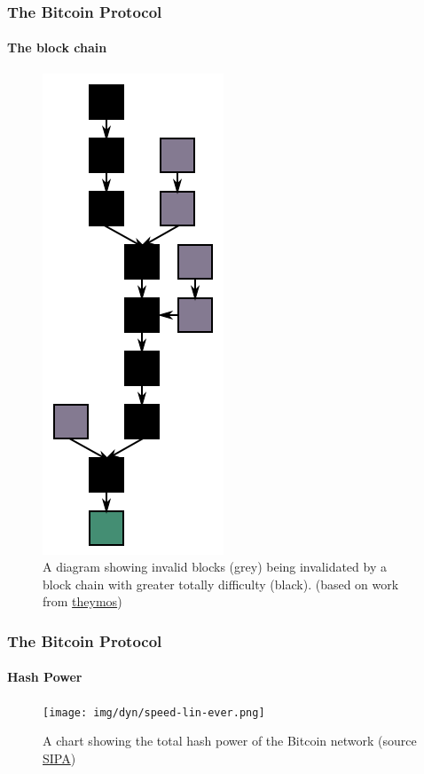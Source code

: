\documentclass{beamer}
\begin{document}
\begin{frame}
\frametitle{The Bitcoin Protocol}
\framesubtitle{The block chain}
\begin{figure}[h!]
    \centering
    \includegraphics[angle=-90,totalwidth=0.8\columnwidth]{img/Blockchain}
    \caption{A diagram showing invalid blocks (grey) being invalidated by a block chain with greater totally difficulty (black). (based on work from \href{http://theymos.com/}{theymos})}
    \label{fig:blockchain}
\end{figure}
\end{frame}

\begin{frame}
\frametitle{The Bitcoin Protocol}
\framesubtitle{Hash Power}
\begin{figure}[h!]
    \centering
    \texttt{[image: img/dyn/speed-lin-ever.png]}
    \caption{A chart showing the total hash power of the Bitcoin network (source \href{http://bitcoin.sipa.be/speed-lin-ever.png}{SIPA})}
    \label{fig:blockchain}
\end{figure}
\end{frame}
\end{document}
